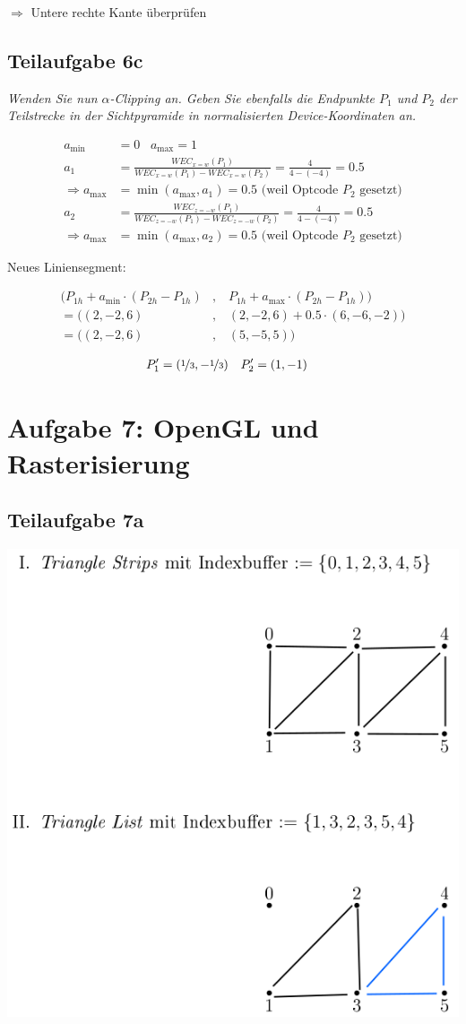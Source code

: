 \documentclass[a4paper]{scrartcl}
\begin{document}
$\Rightarrow$ Untere rechte Kante überprüfen

\subsection*{Teilaufgabe 6c}
\textit{Wenden Sie nun $\alpha$-Clipping an. Geben Sie ebenfalls die Endpunkte
$P_1$ und $P_2$ der Teilstrecke in der Sichtpyramide in normalisierten
Device-Koordinaten an.}

\begin{align}
    a_{\text{min}} &= 0\;\;\; a_{\text{max}} = 1\\
    a_1 &= \frac{WEC_{x=w}(P_1)}{WEC_{x=w}(P_1) - WEC_{x=w}(P_2)} = \frac{4}{4 - (-4)} = 0.5\\
    \Rightarrow a_{\text{max}} &= \min(a_{\text{max}}, a_1) = 0.5 \text{ (weil Optcode } P_2 \text{ gesetzt)}\\
    a_2 &= \frac{WEC_{z=-w}(P_1)}{WEC_{z=-w}(P_1) - WEC_{z=-w}(P_2)} = \frac{4}{4 - (-4)} = 0.5\\
    \Rightarrow a_{\text{max}} &= \min(a_{\text{max}}, a_2) = 0.5 \text{ (weil Optcode } P_2 \text{ gesetzt)}
\end{align}

Neues Liniensegment:

\begin{align}
    (P_{1h} + a_{\text{min}} \cdot (P_{2h} - P_{1h})&,\;\;\; P_{1h} + a_{\text{max}} \cdot (P_{2h} - P_{1h}))\\
  = ((2, -2, 6)&,\;\;\; (2, -2, 6) + 0.5 \cdot (6, -6, -2))\\
  = ((2, -2, 6)&,\;\;\; (5, -5, 5))
\end{align}

\begin{align}
    P_1' &= (\nicefrac{1}{3}, -\nicefrac{1}{3}) & P_2' &= (1, -1)
\end{align}

\clearpage
\section*{Aufgabe 7: OpenGL und Rasterisierung}
\subsection*{Teilaufgabe 7a}
\includegraphics*[width=0.5\linewidth, keepaspectratio]{7a.png}
\end{document}
